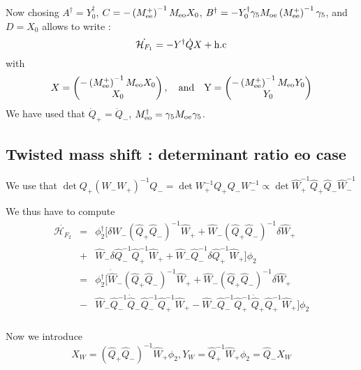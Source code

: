 \documentclass{article}[12pt]
\begin{document}
Now chosing $A^\dagger= Y^\dagger_0 $,
$C=-\left(M^{+}_{\rm{ee}}\right)^{-1} M_{\rm{eo}} X_0 $, $B^\dagger=
- Y_0^\dagger \gamma_5 M_{\rm{oe}}
     \left(M^{+}_{\rm{ee}}\right)^{-1} \gamma_5$, and $D= X_0$ allows to write :
\begin{equation}
\dot{\mathcal{H}_{F_1}} = -  Y^\dagger \dot{Q} X
  + \rm{h.c} 
\end{equation} 
with 
\begin{equation}
X=\begin{pmatrix}-\left(M^{+}_{\rm{ee}}\right)^{-1} M_{\rm{eo}} X_0
  \\ X_0 \end{pmatrix},\quad \rm{and} \quad Y=\begin{pmatrix}-
   \left(M^{+}_{\rm{ee}}\right)^{-1} M_{\rm{eo}} Y_0
  \\ Y_0 \end{pmatrix}
\end{equation}
We have used that   $\dot{Q}_+= \dot{Q}_-$, $M_{\rm{eo}}^{\dagger}=
\gamma_5 M_{\rm{oe}} \gamma_5$.

\subsection{Twisted mass shift : determinant ratio  eo case}

We use that $\det{ Q_+ (W_- 
 W_+)^{-1} Q_-} = \det{W_+^{-1} Q_+ Q_- W_-^{-1}} \propto\det{\hat{W}_+^{-1} \hat{Q}_+ \hat{Q}_- \hat{W}_-^{-1}}  $

We thus have to compute 
\begin{eqnarray}
\dot{\mathcal{H}_{F_2}}  &=& \phi_2^\dagger\big[ \delta \hat{W}_-
(\hat{Q}_+ \hat{Q}_-)^{-1} \hat{W}_+  +  \hat{W}_-
(\hat{Q}_+ \hat{Q}_-)^{-1} \delta \hat{W}_+ \\
&+&  \hat{W}_- \delta \hat{Q}_-^{-1} \hat{Q}_+^{-1} \hat{W}_+ +
\hat{W}_- \hat{Q}_-^{-1} \delta \hat{Q}_+^{-1} \hat{W}_+   \big] \phi_2 \\
&=& \phi_2^\dagger\big[ \dot{\hat{W}}_-
(\hat{Q}_+ \hat{Q}_-)^{-1} \hat{W}_+  +  \hat{W}_-
(\hat{Q}_+ \hat{Q}_-)^{-1} \delta \hat{W}_+ \\
&-&  \hat{W}_- \hat{Q}_-^{-1} \dot{\hat{Q}}_- \hat{Q}_-^{-1} \hat{Q}_+^{-1} \hat{W}_+ -
\hat{W}_- \hat{Q}_-^{-1} \hat{Q}_+^{-1} \dot{\hat{Q}}_+ \hat{Q}_+^{-1} \hat{W}_+   \big] \phi_2 \\
\end{eqnarray}

Now we introduce 
\begin{equation}
X_W =  (\hat{Q}_+ \hat{Q}_-)^{-1} \hat{W}_+ \phi_2,  Y_W =
\hat{Q}_+^{-1} \hat{W}_+\phi_2 = \hat{Q}_- X_W
\end{equation}
\end{document}
